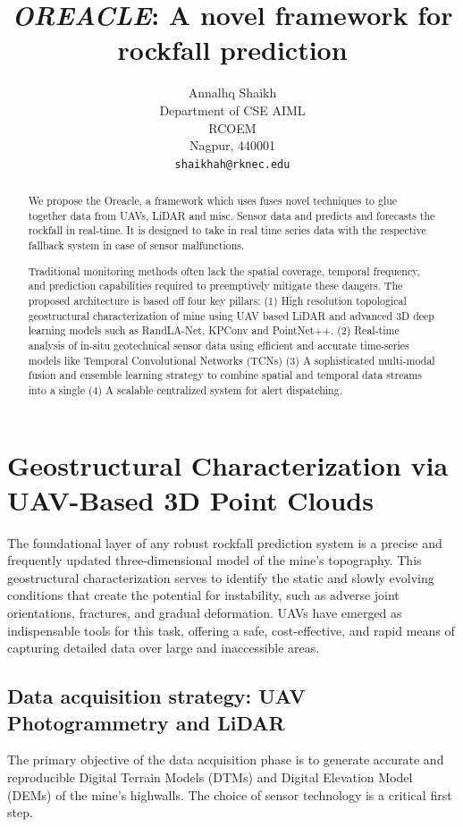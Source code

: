 \documentclass{article}
\title{\emph{OREACLE}: A novel framework for rockfall prediction}
\author{Annalhq Shaikh\\
	Department of CSE AIML\\
	RCOEM\\
	Nagpur, 440001 \\
	\texttt{shaikhah@rknec.edu} \\
}
\begin{document}
\maketitle

\begin{abstract}
We propose the Oreacle, a framework which uses fuses novel techniques to glue together data from UAVs, LiDAR and misc. Sensor data and predicts and forecasts the rockfall in real-time. It is designed to take in real time series data with the respective fallback system in case of sensor malfunctions. 

Traditional monitoring methods often lack the spatial coverage, temporal frequency, and prediction capabilities required to preemptively mitigate these dangers. The proposed architecture is based off four key pillars: (1) High resolution topological geostructural characterization of mine using UAV based LiDAR and advanced 3D deep learning models such as RandLA-Net, KPConv and PointNet++. (2) Real-time analysis of in-situ geotechnical sensor data using efficient and accurate time-series models like Temporal Convolutional Networks (TCNs) (3) A sophisticated multi-modal fusion and ensemble learning strategy to combine spatial and temporal data streams into a single (4) A scalable centralized system for alert dispatching.
\end{abstract}


\section{Geostructural Characterization via UAV-Based 3D Point Clouds}
The foundational layer of any robust rockfall prediction system is a precise and frequently updated three-dimensional model of the mine's topography. This geostructural characterization serves to identify the static and slowly evolving conditions that create the potential for instability, such as adverse joint orientations, fractures, and gradual deformation. UAVs have emerged as indispensable tools for this task, offering a safe, cost-effective, and rapid means of capturing detailed data over large and inaccessible areas.   

\subsection{Data acquisition strategy: UAV Photogrammetry and LiDAR}
The primary objective of the data acquisition phase is to generate accurate and reproducible Digital Terrain Models (DTMs) and Digital Elevation Model (DEMs) of the mine's highwalls. The choice of sensor technology is a critical first step.   
\end{document}
